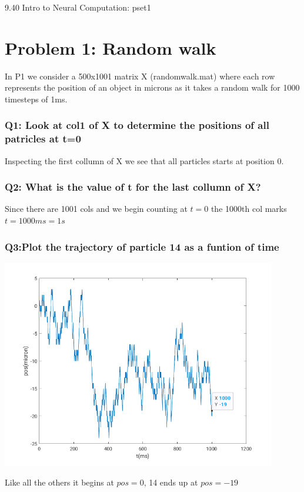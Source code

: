 \documentclass[12pt]{article}
\begin{document}
\Large{9.40 Intro to Neural Computation: pset1}
\section*{Problem 1: Random walk}
In P1 we consider a 500x1001 matrix X (randomwalk.mat) where each row represents the position of an object in microns as it takes a random walk for 1000 timesteps of 1ms.
\subsubsection*{Q1: Look at col1 of X to determine the positions of all patricles at t=0}

\scriptsize{Inspecting the first collumn of X we see that all particles starts at position 0.}

\subsubsection*{Q2: What is the value of t for the last collumn of X?}
Since there are 1001 cols and we begin counting at $t=0$ the 1000th col marks $t=1000ms=1s$
\subsubsection*{Q3:Plot the trajectory of particle 14 as a funtion of time}
\includegraphics[width=0.9\textwidth]{rwof14.png}

\scriptsize{Like all the others it begins at $pos=0$, 14 ends up at $pos=-19$}  
\end{document}
